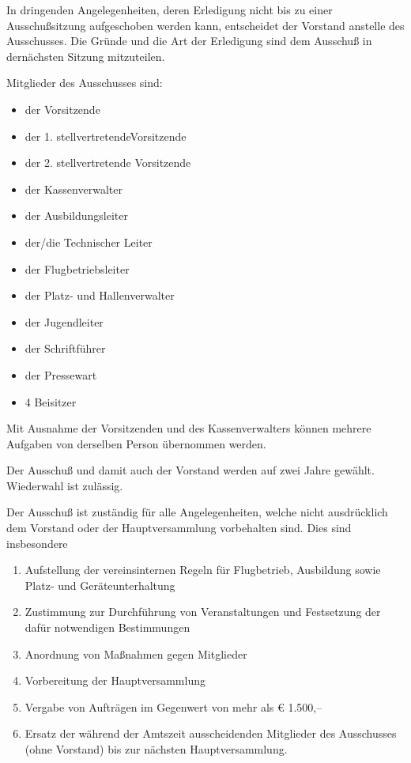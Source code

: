 \documentclass[10pt,a4paper,parskip=half]{scrartcl}
\begin{document}
\begin{contract}
\begin{multicols}{2}
    In dringenden Angelegenheiten,
    deren Erledigung nicht bis zu einer Ausschußsitzung aufgeschoben werden kann,
    entscheidet der Vorstand anstelle des Ausschusses.
    Die Gründe und die Art der Erledigung sind dem Ausschuß in dernächsten Sitzung mitzuteilen.
    
    Mitglieder des Ausschusses sind:
    \begin{itemize}[noitemsep]
      \item der Vorsitzende
      \item der 1. stellvertretendeVorsitzende
      \item der 2. stellvertretende Vorsitzende
      \item der Kassenverwalter
      \item der Ausbildungsleiter
      \item der/die Technischer Leiter
      \item der Flugbetriebsleiter
      \item der Platz- und Hallenverwalter
      \item der Jugendleiter
      \item der Schriftführer
      \item der Pressewart
      \item 4 Beisitzer
    \end{itemize}
    Mit Ausnahme der Vorsitzenden und des Kassenverwalters können mehrere Aufgaben von derselben Person übernommen werden.
    
    Der Ausschuß und damit auch der Vorstand werden auf zwei Jahre gewählt.
    Wiederwahl ist zulässig.
    
    Der Ausschuß ist zuständig für alle Angelegenheiten,
    welche nicht ausdrücklich dem Vorstand oder der Hauptversammlung vorbehalten sind.
    Dies sind insbesondere
    \begin{enumerate}[label=\alph*),noitemsep]
      \item Aufstellung der vereinsinternen Regeln für Flugbetrieb,
            Ausbildung sowie Platz- und Geräteunterhaltung
      \item Zustimmung zur Durchführung von Veranstaltungen und Festsetzung der dafür notwendigen Bestimmungen
      \item Anordnung von Maßnahmen gegen Mitglieder
      \item Vorbereitung der Hauptversammlung
      \item Vergabe von Aufträgen im Gegenwert von mehr als € 1.500,--
      \item Ersatz der während der Amtszeit ausscheidenden Mitglieder des Ausschusses (ohne Vorstand) bis zur nächsten Hauptversammlung.
    \end{enumerate}
    

\end{multicols}
\end{contract}
\end{document}
